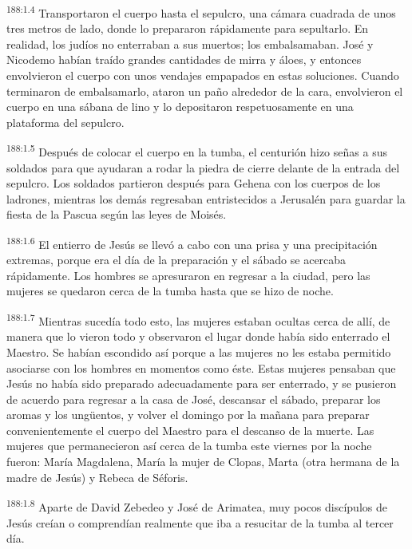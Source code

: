 \par 
\textsuperscript{188:1.4} Transportaron el cuerpo hasta el sepulcro, una cámara cuadrada de unos tres metros de lado, donde lo prepararon rápidamente para sepultarlo. En realidad, los judíos no enterraban a sus muertos; los embalsamaban. José y Nicodemo habían traído grandes cantidades de mirra y áloes, y entonces envolvieron el cuerpo con unos vendajes empapados en estas soluciones. Cuando terminaron de embalsamarlo, ataron un paño alrededor de la cara, envolvieron el cuerpo en una sábana de lino y lo depositaron respetuosamente en una plataforma del sepulcro.

\par 
\textsuperscript{188:1.5} Después de colocar el cuerpo en la tumba, el centurión hizo señas a sus soldados para que ayudaran a rodar la piedra de cierre delante de la entrada del sepulcro. Los soldados partieron después para Gehena con los cuerpos de los ladrones, mientras los demás regresaban entristecidos a Jerusalén para guardar la fiesta de la Pascua según las leyes de Moisés.

\par 
\textsuperscript{188:1.6} El entierro de Jesús se llevó a cabo con una prisa y una precipitación extremas, porque era el día de la preparación y el sábado se acercaba rápidamente. Los hombres se apresuraron en regresar a la ciudad, pero las mujeres se quedaron cerca de la tumba hasta que se hizo de noche.

\par 
\textsuperscript{188:1.7} Mientras sucedía todo esto, las mujeres estaban ocultas cerca de allí, de manera que lo vieron todo y observaron el lugar donde había sido enterrado el Maestro. Se habían escondido así porque a las mujeres no les estaba permitido asociarse con los hombres en momentos como éste. Estas mujeres pensaban que Jesús no había sido preparado adecuadamente para ser enterrado, y se pusieron de acuerdo para regresar a la casa de José, descansar el sábado, preparar los aromas y los ung\"uentos, y volver el domingo por la mañana para preparar convenientemente el cuerpo del Maestro para el descanso de la muerte. Las mujeres que permanecieron así cerca de la tumba este viernes por la noche fueron: María Magdalena, María la mujer de Clopas, Marta (otra hermana de la madre de Jesús) y Rebeca de Séforis.

\par 
\textsuperscript{188:1.8} Aparte de David Zebedeo y José de Arimatea, muy pocos discípulos de Jesús creían o comprendían realmente que iba a resucitar de la tumba al tercer día.

